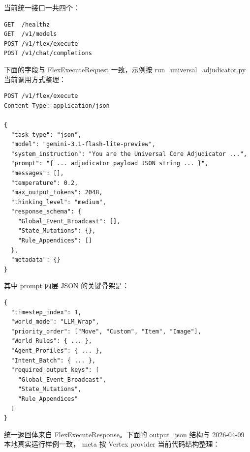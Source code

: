 \documentclass[11pt,a4paper]{article}
\newcommand{\sect}[1]{\vspace{8pt}{\sectionfont #1}\par}
\newcommand{\code}[1]{{\smallmono #1}}
\begin{document}
\sect{4. 统一 Flex API}
当前统一接口一共四个：

\begin{verbatim}
GET  /healthz
GET  /v1/models
POST /v1/flex/execute
POST /v1/chat/completions
\end{verbatim}

\sect{4.1 /v1/flex/execute 请求示例}
下面的字段与 \code{FlexExecuteRequest} 一致，示例按
\code{run\_universal\_adjudicator.py} 当前调用方式整理：

\begin{verbatim}
POST /v1/flex/execute
Content-Type: application/json

{
  "task_type": "json",
  "model": "gemini-3.1-flash-lite-preview",
  "system_instruction": "You are the Universal Core Adjudicator ...",
  "prompt": "{ ... adjudicator payload JSON string ... }",
  "messages": [],
  "temperature": 0.2,
  "max_output_tokens": 2048,
  "thinking_level": "medium",
  "response_schema": {
    "Global_Event_Broadcast": [],
    "State_Mutations": {},
    "Rule_Appendices": []
  },
  "metadata": {}
}
\end{verbatim}

其中 \code{prompt} 内层 JSON 的关键骨架是：

\begin{verbatim}
{
  "timestep_index": 1,
  "world_mode": "LLM_Wrap",
  "priority_order": ["Move", "Custom", "Item", "Image"],
  "World_Rules": { ... },
  "Agent_Profiles": { ... },
  "Intent_Batch": { ... },
  "required_output_keys": [
    "Global_Event_Broadcast",
    "State_Mutations",
    "Rule_Appendices"
  ]
}
\end{verbatim}

\sect{4.2 /v1/flex/execute 返回示例}
统一返回体来自 \code{FlexExecuteResponse}。下面的
\code{output\_json} 结构与 2026-04-09 本地真实运行样例一致，
\code{meta} 按 Vertex provider 当前代码结构整理：
\end{document}
